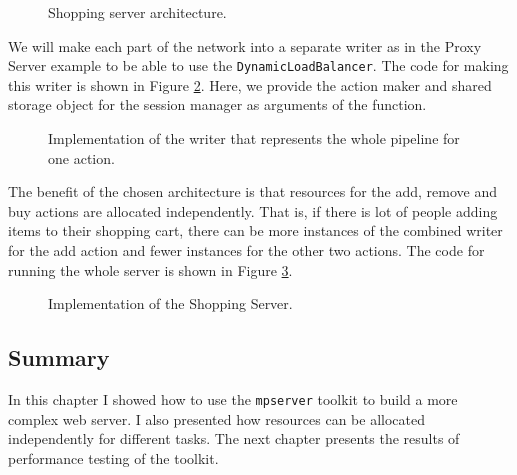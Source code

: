 \begin{figure}[h]
\caption[scale=1.0]{Shopping server architecture.}
\label{fig:shoppingDesign}
\end{figure}

We will make each part of the network into a separate writer as in
the Proxy Server example to be able to use the \texttt{DynamicLoadBalancer}.
The code for making this writer is shown in Figure \ref{fig:shoppingWriter}.
Here, we provide the action maker and shared storage object for the session manager 
as arguments of the function.

\begin{figure}[h]
 
\caption[scale=1.0]{Implementation of the writer that represents the whole
pipeline for one action.}
\label{fig:shoppingWriter}
\end{figure}

The benefit of the chosen architecture is that resources for the add, remove
and buy actions are allocated independently. That is, if there is lot of 
people adding items to their shopping cart, there can be more instances
of the combined writer for the add action and fewer instances for the
other two actions. The code for running the whole server is shown
in Figure \ref{fig:ShoppingCode}.

\begin{figure}
 
\caption[scale=1.0]{Implementation of the Shopping Server.}
\label{fig:ShoppingCode}
\end{figure}

\subsection{Summary}
In this chapter I showed how to use the \texttt{mpserver} toolkit
to build a more complex web server. I also presented how resources can
be allocated independently for different tasks. The next chapter 
presents the results of performance testing of the toolkit.


